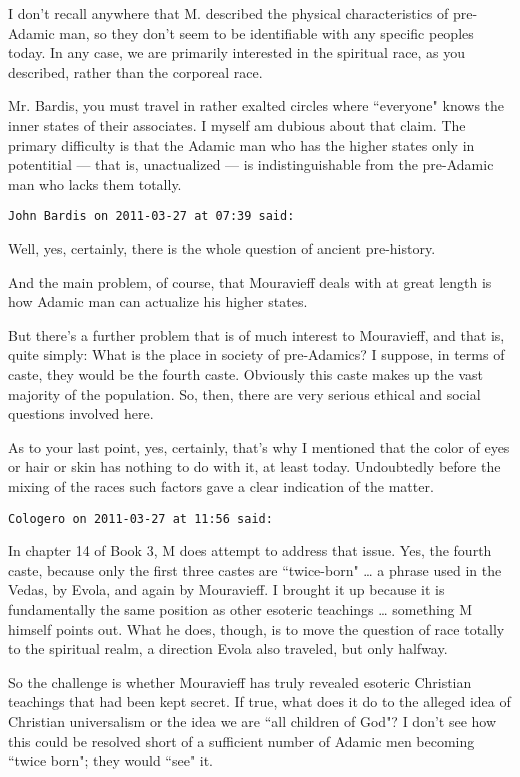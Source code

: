 \begin{footnotesize}
\begin{sffamily}
\begin{quotex}
\end{quotex}
I don't recall anywhere that M. described the physical characteristics of pre-Adamic man, so they don't seem to be identifiable with any specific peoples today. In any case, we are primarily interested in the spiritual race, as you described, rather than the corporeal race.

Mr. Bardis, you must travel in rather exalted circles where ``everyone" knows the inner states of their associates. I myself am dubious about that claim. The primary difficulty is that the Adamic man who has the higher states only in potentitial — that is, unactualized — is indistinguishable from the pre-Adamic man who lacks them totally.


\hfill

\texttt{John Bardis on 2011-03-27 at 07:39 said: }

Well, yes, certainly, there is the whole question of ancient pre-history.

And the main problem, of course, that Mouravieff deals with at great length is how Adamic man can actualize his higher states.

But there's a further problem that is of much interest to Mouravieff, and that is, quite simply: What is the place in society of pre-Adamics? I suppose, in terms of caste, they would be the fourth caste. Obviously this caste makes up the vast majority of the population. So, then, there are very serious ethical and social questions involved here.

As to your last point, yes, certainly, that's why I mentioned that the color of eyes or hair or skin has nothing to do with it, at least today. Undoubtedly before the mixing of the races such factors gave a clear indication of the matter.


\hfill

\texttt{Cologero on 2011-03-27 at 11:56 said: }

In chapter 14 of Book 3, M does attempt to address that issue. Yes, the fourth caste, because only the first three castes are ``twice-born" … a phrase used in the Vedas, by Evola, and again by Mouravieff. I brought it up because it is fundamentally the same position as other esoteric teachings … something M himself points out. What he does, though, is to move the question of race totally to the spiritual realm, a direction Evola also traveled, but only halfway.

So the challenge is whether Mouravieff has truly revealed esoteric Christian teachings that had been kept secret. If true, what does it do to the alleged idea of Christian universalism or the idea we are ``all children of God"? I don't see how this could be resolved short of a sufficient number of Adamic men becoming ``twice born"; they would ``see" it.



\end{sffamily}
\end{footnotesize}
